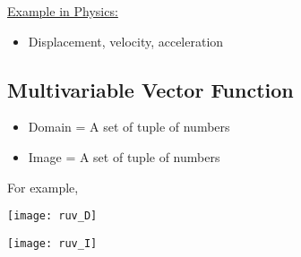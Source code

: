 \documentclass[class=article, crop=false, 12pt]{standalone}
\begin{document}
\ul{Example in Physics:}
\begin{itemize}
    \item Displacement, velocity, acceleration
\end{itemize}

\subsection{Multivariable Vector Function}

\begin{itemize}
    \item Domain = A set of tuple of numbers
    \item Image = A set of tuple of numbers
\end{itemize}

For example,

\begin{center}
    \begin{minipage}{0.3\textwidth}
        \centering
        \texttt{[image: ruv\_D]}
    \end{minipage}
    \green{$\xrightarrow{\hspace{0.2\textwidth}}$}
    \begin{minipage}{0.3\textwidth}
        \centering
        \texttt{[image: ruv\_I]}
    \end{minipage}
    \begin{minipage}{0.15\textwidth}
    \end{minipage}
\end{center}
\end{document}
